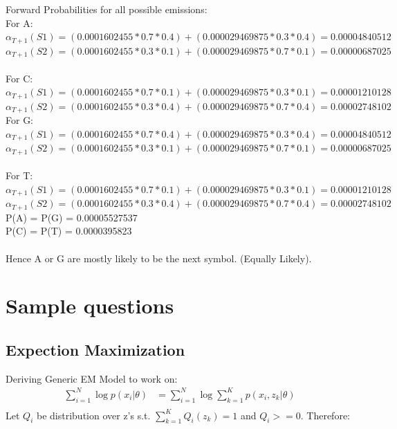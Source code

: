 \documentclass[paper=a4, fontsize=11pt]{scrartcl} %
\numberwithin{equation}{section} %
\numberwithin{figure}{section} %
\numberwithin{table}{section} %
\begin{document}
Forward Probabilities for all possible emissions:\\

For A:\\
$\alpha_{T+1}(S1) = (0.0001602455*0.7*0.4)+(0.000029469875*0.3*0.4) = 0.00004840512$\\
$\alpha_{T+1}(S2) = (0.0001602455*0.3*0.1)+(0.000029469875*0.7*0.1) = 0.00000687025$\\\\

For C:\\
$\alpha_{T+1}(S1) = (0.0001602455*0.7*0.1)+(0.000029469875*0.3*0.1) = 0.00001210128$\\
$\alpha_{T+1}(S2) = (0.0001602455*0.3*0.4)+(0.000029469875*0.7*0.4) = 0.00002748102$\\

For G:\\
$\alpha_{T+1}(S1) = (0.0001602455*0.7*0.4)+(0.000029469875*0.3*0.4) = 0.00004840512$\\
$\alpha_{T+1}(S2) = (0.0001602455*0.3*0.1)+(0.000029469875*0.7*0.1) = 0.00000687025$\\\\

For T:\\
$\alpha_{T+1}(S1) = (0.0001602455*0.7*0.1)+(0.000029469875*0.3*0.1) = 0.00001210128$\\
$\alpha_{T+1}(S2) = (0.0001602455*0.3*0.4)+(0.000029469875*0.7*0.4) = 0.00002748102$\\

P(A) = P(G) = 0.00005527537\\
P(C) = P(T) = 0.0000395823 \\\\

Hence A or G are mostly likely to be the next symbol. (Equally Likely).
\section{Sample questions}
\subsection{Expection Maximization}

Deriving Generic EM Model to work on:
\begin{align*} 
\sum_{i=1}^{N} \log p(x_{i}|\theta) &= \sum_{i=1}^{N} \log \sum_{k=1}^{K} p(x_{i},z_{k}|\theta)\\
\end{align*}
Let $Q_{i}$ be distribution over z's s.t. $\sum_{k=1}^{K} Q_{i}(z_{k}) = 1$ and $Q_{i}>=0$. Therefore:
\end{document}
